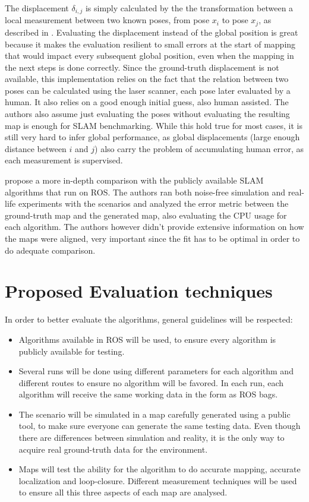  The displacement $\delta_{i, j}$ is simply calculated by the the transformation between a local measurement between two known poses, from pose $x_i$ to pose $x_j$, as described in . Evaluating the displacement instead of the global position is great because it makes the evaluation resilient to small errors at the start of mapping that would impact every subsequent global position, even when the mapping in the next steps is done correctly. Since the ground-truth displacement is not available, this implementation relies on the fact that the relation between two poses can be calculated using the laser scanner, each pose later evaluated by a human. It also relies on a good enough initial guess, also human assisted. The authors also assume just evaluating the poses without evaluating the resulting map is enough for SLAM benchmarking. While this hold true for most cases, it is still very hard to infer global performance, as global displacements (large enough distance between $i$ and $j$) also carry the problem of accumulating human error, as each measurement is supervised.
 
 \citeauthor{santos2013evaluation} propose a more in-depth comparison with the publicly available SLAM algorithms that run on ROS. The authors ran both noise-free simulation and real-life experiments with the scenarios and analyzed the error metric between the ground-truth map and the generated map, also evaluating the CPU usage for each algorithm. The authors however didn't provide extensive information on how the maps were aligned, very important since the fit has to be optimal in order to do adequate comparison.
 
 \section{Proposed Evaluation techniques}
 
 In order to better evaluate the algorithms, general guidelines will be respected:
 
 \begin{itemize}
     \item Algorithms available in ROS will be used, to ensure every algorithm is publicly available for testing.
     \item Several runs will be done using different parameters for each algorithm and different routes to ensure no algorithm will be favored. In each run, each algorithm will receive the same working data in the form as ROS bags.
     \item The scenario will be simulated in a map carefully generated using a public tool, to make sure everyone can generate the same testing data. Even though there are differences between simulation and reality, it is the only way to acquire real ground-truth data for the environment.
     \item Maps will test the ability for the algorithm to do accurate mapping, accurate localization and loop-closure. Different measurement techniques will be used to ensure all this three aspects of each map are analysed.
 \end{itemize}
 
